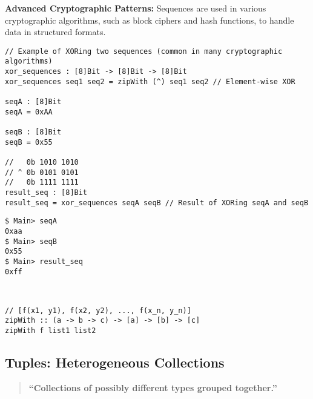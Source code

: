 \vspace{16pt}
\newpage
\noindent\textbf{Advanced Cryptographic Patterns:} Sequences are used in various cryptographic algorithms, such as block ciphers and hash functions, to handle data in structured formats.
\begin{lstlisting}[style=cryptol]
// Example of XORing two sequences (common in many cryptographic algorithms)
xor_sequences : [8]Bit -> [8]Bit -> [8]Bit
xor_sequences seq1 seq2 = zipWith (^) seq1 seq2 // Element-wise XOR

seqA : [8]Bit
seqA = 0xAA

seqB : [8]Bit
seqB = 0x55

//   0b 1010 1010
// ^ 0b 0101 0101
//   0b 1111 1111
result_seq : [8]Bit
result_seq = xor_sequences seqA seqB // Result of XORing seqA and seqB
\end{lstlisting}
\begin{lstlisting}[style=zsh]
$ Main> seqA
0xaa
$ Main> seqB
0x55
$ Main> result_seq
0xff
\end{lstlisting}
\begin{note}
\ \begin{lstlisting}[style=haskell]
// [f(x1, y1), f(x2, y2), ..., f(x_n, y_n)]
zipWith :: (a -> b -> c) -> [a] -> [b] -> [c]
zipWith f list1 list2
\end{lstlisting}
\end{note}

\subsection{Tuples: Heterogeneous Collections}
\begin{quote}\bf
``Collections of possibly different types grouped together.''
\end{quote}

